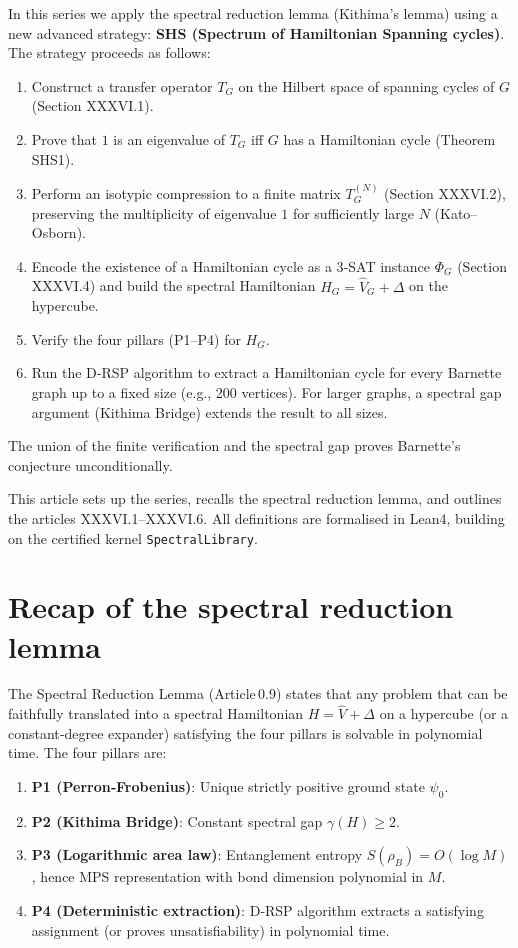 \documentclass[11pt,a4paper]{article}
\begin{document}
In this series we apply the spectral reduction lemma (Kithima's lemma) using a new advanced strategy: \textbf{SHS (Spectrum of Hamiltonian Spanning cycles)}. The strategy proceeds as follows:
\begin{enumerate}
\item Construct a transfer operator \(T_G\) on the Hilbert space of spanning cycles of \(G\) (Section XXXVI.1).
\item Prove that \(1\) is an eigenvalue of \(T_G\) iff \(G\) has a Hamiltonian cycle (Theorem SHS1).
\item Perform an isotypic compression to a finite matrix \(T_G^{(N)}\) (Section XXXVI.2), preserving the multiplicity of eigenvalue \(1\) for sufficiently large \(N\) (Kato–Osborn).
\item Encode the existence of a Hamiltonian cycle as a 3‑SAT instance \(\Phi_G\) (Section XXXVI.4) and build the spectral Hamiltonian \(H_G = \hat{V}_G + \Delta\) on the hypercube.
\item Verify the four pillars (P1–P4) for \(H_G\).
\item Run the D‑RSP algorithm to extract a Hamiltonian cycle for every Barnette graph up to a fixed size (e.g., 200 vertices). For larger graphs, a spectral gap argument (Kithima Bridge) extends the result to all sizes.
\end{enumerate}
The union of the finite verification and the spectral gap proves Barnette's conjecture unconditionally.

This article sets up the series, recalls the spectral reduction lemma, and outlines the articles XXXVI.1–XXXVI.6. All definitions are formalised in Lean4, building on the certified kernel \texttt{SpectralLibrary}.

\section{Recap of the spectral reduction lemma}

The Spectral Reduction Lemma (Article 0.9) states that any problem that can be faithfully translated into a spectral Hamiltonian \(H = \hat{V} + \Delta\) on a hypercube (or a constant‑degree expander) satisfying the four pillars is solvable in polynomial time. The four pillars are:

\begin{enumerate}
\item \textbf{P1 (Perron‑Frobenius)}: Unique strictly positive ground state \(\psi_0\).
\item \textbf{P2 (Kithima Bridge)}: Constant spectral gap \(\gamma(H) \ge 2\).
\item \textbf{P3 (Logarithmic area law)}: Entanglement entropy \(S(\rho_B)=O(\log M)\), hence MPS representation with bond dimension polynomial in \(M\).
\item \textbf{P4 (Deterministic extraction)}: D‑RSP algorithm extracts a satisfying assignment (or proves unsatisfiability) in polynomial time.
\end{enumerate}
\end{document}

